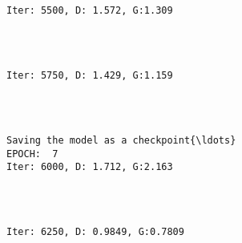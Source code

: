 \documentclass[11pt]{article}
\begin{document}
    \begin{center}
    \end{center}
    { \hspace*{\fill} \\}
    
    \begin{Verbatim}[commandchars=\\\{\}]

Iter: 5500, D: 1.572, G:1.309
    \end{Verbatim}

    \begin{center}
    \end{center}
    { \hspace*{\fill} \\}
    
    \begin{Verbatim}[commandchars=\\\{\}]

Iter: 5750, D: 1.429, G:1.159
    \end{Verbatim}

    \begin{center}
    \end{center}
    { \hspace*{\fill} \\}
    
    \begin{Verbatim}[commandchars=\\\{\}]

Saving the model as a checkpoint{\ldots}
EPOCH:  7
Iter: 6000, D: 1.712, G:2.163
    \end{Verbatim}

    \begin{center}
    \end{center}
    { \hspace*{\fill} \\}
    
    \begin{Verbatim}[commandchars=\\\{\}]

Iter: 6250, D: 0.9849, G:0.7809
    \end{Verbatim}
\end{document}
